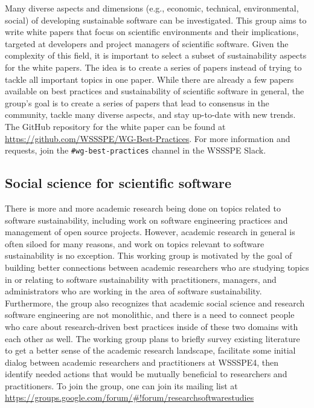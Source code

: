\documentclass[11pt, oneside]{amsart}
\newcommand{\note}[1]{ {\textcolor{blueish}    { ***Note:      #1 }}}
\begin{document}
Many diverse aspects and dimensions (e.g., economic, technical, environmental, social) of developing sustainable software can be investigated.
This group aims to write white papers
that focus on scientific environments and their implications, targeted at developers
and project managers of scientific software. Given the complexity of this field, it is important to select
a subset of sustainability aspects for the white papers. The idea is to create a series of papers instead of trying
to tackle all important topics in one paper.
%
While there are already a few papers available on best practices and sustainability of scientific software in general, the group's goal is to create a series of papers that lead to consensus in the community, tackle many diverse aspects, and stay up-to-date with new trends.
%
The GitHub repository for the white paper can be found at \url{https://github.com/WSSSPE/WG-Best-Practices}. For more information and requests, join the \texttt{\#wg-best-practices} channel in the WSSSPE Slack.



\subsection{Social science for scientific software}
\label{sec:social}





There is more and more academic research being done on topics related to software sustainability, including work on software engineering practices and management of open source projects. However, academic research in general is often siloed for many reasons, and work on topics relevant to software sustainability is no exception. 
%
This working group is motivated by the goal of building better connections between academic researchers who are studying topics in or relating to software sustainability with practitioners, managers, and administrators who are working in the area of software sustainability.
%
Furthermore, the group also recognizes that academic social science and research software engineering are not monolithic, and there is a need to connect people who care about research-driven best practices inside of these two domains with each other as well.
%
The working group plans to briefly survey existing literature to get a better sense of the academic research landscape, facilitate some initial dialog between academic researchers and practitioners at WSSSPE4, then identify needed actions that would be mutually beneficial to researchers and practitioners.
%
To join the group, one can join its mailing list at \url{https://groups.google.com/forum/#!forum/researchsoftwarestudies}
\end{document}
